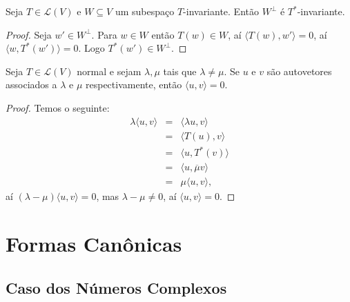 \documentclass[11pt,twoside,a4paper]{book}
\begin{document}
\begin{lema}
Seja $T\in\mathcal{L}(V)$ e $W\subseteq V$ um subespaço $T$-invariante. Então $W^\perp$ é $T^*$-invariante.
\end{lema}
\begin{proof}
Seja $w'\in W^\perp$. Para $w\in W$ então $T(w)\in W$, aí $\langle T(w),w'\rangle=0$, aí $\langle w,T^*(w')\rangle=0$. Logo $T^*(w')\in W^\perp$.
\end{proof}

\begin{lema}
Seja $T\in\mathcal{L}(V)$ normal e sejam $\lambda,\mu$ tais que $\lambda\neq\mu$. Se $u$ e $v$ são autovetores associados a $\lambda$ e $\mu$ respectivamente, então $\langle u,v\rangle=0$.
\end{lema}
\begin{proof}
Temos o seguinte:
\[
\begin{array}{rcl}
\lambda\langle u,v\rangle&=&\langle\lambda u,v\rangle\\
&=&\langle T(u),v\rangle\\
&=&\langle u,T^*(v)\rangle\\
&=&\langle u,\overline{\mu}v\rangle\\
&=&\mu\langle u,v\rangle,
\end{array}
\]
aí $(\lambda-\mu)\langle u,v\rangle=0$, mas $\lambda-\mu\neq 0$, aí $\langle u,v\rangle=0$.
\end{proof}

\section{Formas Canônicas}

\subsection{Caso dos Números Complexos}
\end{document}
